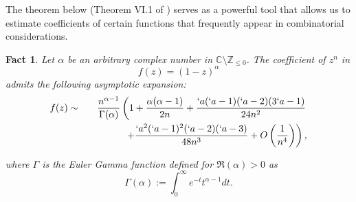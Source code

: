 \documentclass{jfp1}
\newtheorem{fact}[theo]{Fact}
\begin{document}
The theorem below (Theorem VI.1 of \cite{flajolet08:_analy_combin}) serves as a powerful tool that allows us to estimate coefficients of certain functions that frequently appear in combinatorial considerations.

\begin{fact}\label{fact:asym_exp}
Let $\alpha$ be an arbitrary complex number in $\mathbb{C}\setminus \mathbb{Z}_{\leq 0}$. The coefficient of $z^n$ in
\[ f(z) = (1-z)^{\alpha} \]
admits the following asymptotic expansion:
\begin{eqnarray*}
[z^n]f(z) &\sim& \frac{n^{\alpha - 1}}{\Gamma (\alpha)} \left( 1 + \frac{\alpha (\alpha -
    1)}{2n}  + \frac{`a(`a-1)(`a-2)(3`a-1)}{24n^2}\right. \\
&& \qquad\qquad \left. + \frac{`a^2(`a-1)^2(`a -2)(`a-3)}{48n^3}+ O \left( \frac{1}{n^{4}} \right) \right) ,
\end{eqnarray*}

where $\Gamma$ is the Euler Gamma function defined for $\Re(\alpha) > 0$ as
\[ \Gamma ( \alpha ) := \int_{0}^{\infty} e^{-t} t^{\alpha -1 } dt .\]
\end{fact}
\end{document}
